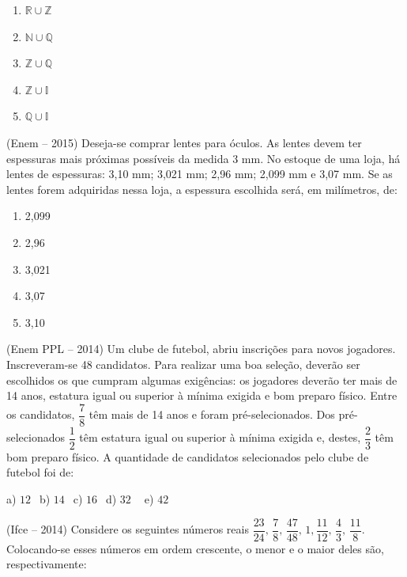 \begin{multicols*}{2}
\begin{enumerate}
			      \item $ \mathbb{R} \cup \mathbb{Z} $
			      \item $ \mathbb{N} \cup \mathbb{Q} $
			      \item $ \mathbb{Z} \cup \mathbb{Q} $
			      \item $ \mathbb{Z} \cup \mathbb{I} $
			      \item $ \mathbb{Q} \cup \mathbb{I} $

		      \end{enumerate}

		\execnum (Enem – 2015) Deseja-se comprar lentes para óculos. As lentes devem ter espessuras mais próximas possíveis da medida 3 mm. No estoque de uma loja, há lentes de espessuras: 3,10 mm; 3,021 mm; 2,96 mm; 2,099 mm e 3,07 mm.
		      Se as lentes forem adquiridas nessa loja, a espessura escolhida será, em milímetros, de:

		      \begin{enumerate}

			      \item 2,099
			      \item 2,96
			      \item 3,021
			      \item 3,07
			      \item 3,10

		      \end{enumerate}

		\execnum (Enem PPL – 2014) Um clube de futebol, abriu inscrições para novos jogadores. Inscreveram-se 48 candidatos. Para realizar uma boa seleção, deverão ser escolhidos os que cumpram algumas exigências: os jogadores deverão ter mais de 14 anos, estatura igual ou superior à mínima exigida e bom preparo físico. Entre os candidatos, $\dfrac{7}{8}$ têm mais de 14 anos e foram pré-selecionados. Dos pré-selecionados $\dfrac{1}{2}$ têm estatura igual ou superior à mínima exigida e, destes, $\dfrac{2}{3}$ têm bom preparo físico. A quantidade de candidatos selecionados pelo clube de futebol foi de:

		      a) $12 \ \ $ b) $14 \ \ $ c) $16 \ \ $ d) $32 \ \ \ \ $ e) $42 \ \ $

		\execnum (Ifce – 2014) Considere os seguintes números reais $\dfrac{23}{24},\, \dfrac{7}{8},\, \dfrac{47}{48},\, 1, \dfrac{11}{12},\, \dfrac{4}{3},\, \dfrac{11}{8} $. Colocando-se esses números em ordem crescente, o menor e o maior deles são, respectivamente:

		      \begin{enumerate}


\end{enumerate}
\end{multicols*}
